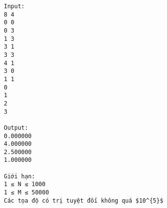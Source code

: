 \begin{verbatim}
Input:
8 4
0 0
0 3
1 3
3 1
3 3
4 1
3 0
1 1
0
1
2
3

Output:
0.000000
4.000000
2.500000
1.000000

Giới hạn:
1 ≤ N ≤ 1000 
1 ≤ M ≤ 50000
Các tọa độ có trị tuyệt đối không quá $10^{5}$\end{verbatim}